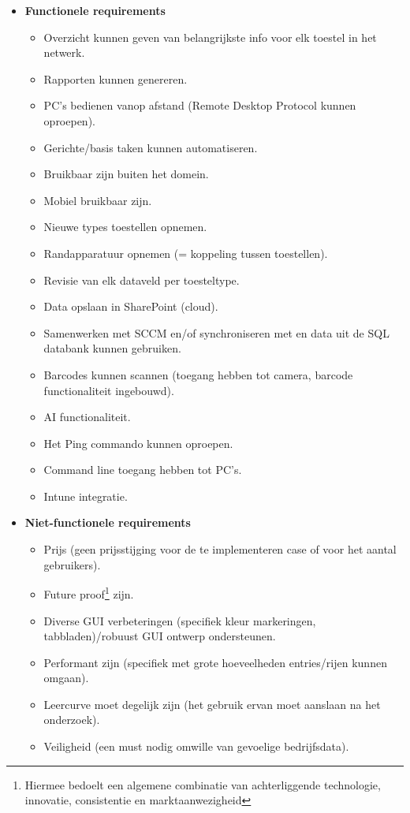 \begin{itemize}
    \item \textbf{Functionele requirements}
    \begin{itemize}
        \item Overzicht kunnen geven van belangrijkste info voor elk toestel in het netwerk.
        \item Rapporten kunnen genereren.
        \item PC's bedienen vanop afstand (Remote Desktop Protocol kunnen oproepen).
        \item Gerichte/basis taken kunnen automatiseren.
        \item Bruikbaar zijn buiten het domein.
        \item Mobiel bruikbaar zijn.
        \item Nieuwe types toestellen opnemen.
        \item Randapparatuur opnemen (= koppeling tussen toestellen).
        \item Revisie van elk dataveld per toesteltype.
        \item Data opslaan in SharePoint (cloud).
        \item Samenwerken met SCCM en/of synchroniseren met en data uit de SQL databank kunnen gebruiken.
        \item Barcodes kunnen scannen (toegang hebben tot camera, barcode functionaliteit ingebouwd).
        \item AI functionaliteit.
        \item Het Ping commando kunnen oproepen.
        \item Command line toegang hebben tot PC's.
        \item Intune integratie.
    \end{itemize}
    \item \textbf{Niet-functionele requirements}
    \begin{itemize}
        \item Prijs (geen prijsstijging voor de te implementeren case of voor het aantal gebruikers).
        \item Future proof\footnote{Hiermee bedoelt een algemene combinatie van achterliggende technologie, innovatie, consistentie en marktaanwezigheid} zijn.
        \item Diverse GUI verbeteringen (specifiek kleur markeringen, tabbladen)/robuust GUI ontwerp ondersteunen.
        \item Performant zijn (specifiek met grote hoeveelheden entries/rijen kunnen omgaan).
        \item Leercurve moet degelijk zijn (het gebruik ervan moet aanslaan na het onderzoek).
        \item Veiligheid (een must nodig omwille van gevoelige bedrijfsdata).
    \end{itemize}
\end{itemize}

